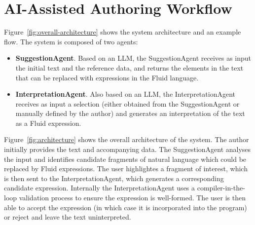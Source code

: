 \section{AI-Assisted Authoring Workflow}
\label{sec:authoring-workflow}

Figure~\ref{fig:overall-architecture} shows the system architecture and an example flow.
The system is composed of two agents:

\begin{itemize}
    \item \textbf{SuggestionAgent}. Based on an LLM, the SuggestionAgent receives as input the initial text and the reference data, and returns the elements in the text that can be replaced with expressions in the Fluid language.
    \item \textbf{InterpretationAgent}. Also based on an LLM, the InterpretationAgent receives as input a selection (either obtained from the SuggestionAgent or manually defined by the author) and generates an interpretation of the text as a Fluid expression.
\end{itemize}

Figure~\ref{fig:architecture} shows the overall architecture of the system.
The author initially provides the text and accompanying data.
The SuggestionAgent analyses the input and identifies candidate fragments of natural language which could be replaced by Fluid expressions.
The user highlightes a fragment of interest, which is then sent to the InterpretationAgent, which generates a corresponding candidate expression.
Internally the InterpretationAgent uses a compiler-in-the-loop validation process to ensure the expression is well-formed.
The user is then able to accept the expression (in which case it is incorporated into the program) or reject and leave the text uninterpreted.

